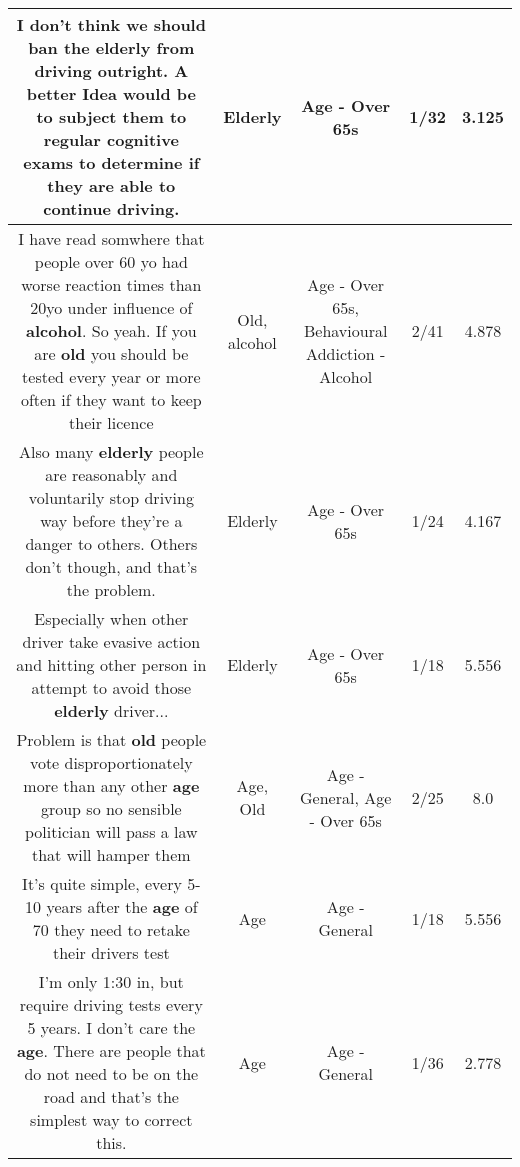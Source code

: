 \documentclass[11pt]{article}
\newlength\mylength
\begin{document}
\begin{center}
\begin{longtable}{|C{.65\mylength}|C{.30\mylength}|C{.12\mylength}|C{.12\mylength}|C{.12\mylength}|}
  \small I don't think we should ban the \textbf{elderly} from driving outright. A better Idea would be to subject them to regular cognitive exams to determine if they are able to continue driving.\normalsize   & Elderly & Age - Over 65s & 1/32 & 3.125 \\  \hline
  \small I have read somwhere that people over 60 yo had worse reaction times than 20yo under influence of \textbf{alcohol}. So yeah. If you are \textbf{old} you should be tested every year or more often if they want to keep their licence\normalsize   & Old, alcohol & Age - Over 65s, Behavioural Addiction - Alcohol & 2/41 & 4.878 \\  \hline
  \small Also many \textbf{elderly} people are reasonably and voluntarily stop driving way before they're a danger to others. Others don't though, and that's the problem.\normalsize   & Elderly & Age - Over 65s & 1/24 & 4.167 \\  \hline
  \small Especially when other driver take evasive action and hitting other person in attempt to avoid those \textbf{elderly} driver...\normalsize   & Elderly & Age - Over 65s & 1/18 & 5.556 \\  \hline
  \small Problem is that \textbf{old} people vote disproportionately more than any other \textbf{age} group so no sensible politician will pass a law that will hamper them\normalsize   & Age, Old & Age - General, Age - Over 65s & 2/25 & 8.0 \\  \hline
  \small It's quite simple, every 5-10 years after the \textbf{age} of 70 they need to retake their drivers test\normalsize   & Age & Age - General & 1/18 & 5.556 \\  \hline
  \small I'm only 1:30 in, but require driving tests every 5 years. I don't care the \textbf{age}. There are people that do not need to be on the road and that's the simplest way to correct this.\normalsize   & Age & Age - General & 1/36 & 2.778 \\  \hline

\end{longtable}
\end{center}
\end{document}
